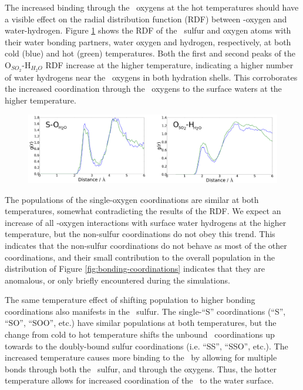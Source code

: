 The increased binding through the \suldiox~oxygens at the hot temperatures should have a visible effect on the radial distribution function (RDF) between \suldiox-oxygen and water-hydrogen. Figure \ref{fig:rdf} shows the RDF of the \suldiox~sulfur and oxygen atoms with their water bonding partners, water oxygen and hydrogen, respectively, at both cold (blue) and hot (green) temperatures. Both the first and second peaks of the O$_{SO_2}$-H$_{H_2O}$ RDF increase at the higher temperature, indicating a higher number of water hydrogens near the \suldiox~oxygens in both hydration shells. This corroborates the increased coordination through the \suldiox~oxygens to the surface waters at the higher temperature.

\begin{figure}[h!]
	\begin{center}
		\includegraphics[scale=1.0]{images/rdf/rdf-small.png}
		\caption{}
		\label{fig:rdf}
	\end{center}
\end{figure}

The populations of the single-oxygen coordinations are similar at both temperatures, somewhat contradicting the results of the RDF. We expect an increase of all \suldiox-oxygen interactions with surface water hydrogens at the higher temperature, but the non-sulfur coordinations do not obey this trend. This indicates that the non-sulfur coordinations do not behave as most of the other coordinations, and their small contribution to the overall population in the distribution of Figure \ref{fig:bonding-coordinations} indicates that they are anomalous, or only briefly encountered during the simulations.

The same temperature effect of shifting population to higher bonding coordinations also manifests in the \suldiox~sulfur. The single-``S'' coordinations (``S'', ``SO'', ``SOO'', etc.) have similar populations at both temperatures, but the change from cold to hot temperature shifts the unbound \suldiox~coordinations up towards to the doubly-bound sulfur coordinations (i.e. ``SS'', ``SSO'', etc.). The increased temperature causes more binding to the \suldiox~by allowing for multiple bonds through both the \suldiox~sulfur, and through the oxygens. Thus, the hotter temperature allows for increased coordination of the \suldiox~to the water surface.

